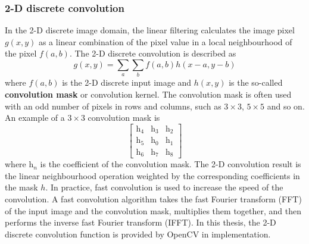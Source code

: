 \subsubsection{2-D discrete convolution}
In the 2-D discrete image domain, the linear filtering calculates the image pixel $g(x,y)$ as a linear combination of the pixel value in a local neighbourhood of the pixel $f(a,b)$. The 2-D discrete convolution is described as
\begin{equation}
g(x,y)=\sum_{a}\sum_{b}f(a,b)h(x-a,y-b)
\end{equation}
where $f(a,b)$ is the 2-D discrete input image and $h(x,y)$ is the so-called \textbf{convolution mask} or convolution kernel. The convolution mask is often used with an odd number of pixels in rows and columns, such as $3\times3$, $5\times5$ and so on. An example \cite{Davies1990} of a $3\times3$ convolution mask is
\begin{displaymath}
 \left[  \begin{array}{ccc}
          \mathrm{h}_{4} &\mathrm{h}_{3} & \mathrm{h}_{2} \\
	  \mathrm{h}_{5} & \mathrm{h}_{0} & \mathrm{h}_{1} \\
	  \mathrm{h}_{6} & \mathrm{h}_{7} & \mathrm{h}_{8} 
         \end{array}
\right ]
\end{displaymath}
where $\mathrm{h}_{n}$ is the coefficient of the convolution mask. The 2-D convolution result is the linear neighbourhood operation weighted by the corresponding coefficients in the mask $h$. In practice, fast convolution is used to increase the speed of the convolution. A fast convolution algorithm takes the fast Fourier transform (FFT) of the input image and the convolution mask, multiplies them together, and then performs the inverse fast Fourier transform (IFFT). In this thesis, the 2-D discrete convolution function is provided by OpenCV \cite{Landre2003} in implementation.

